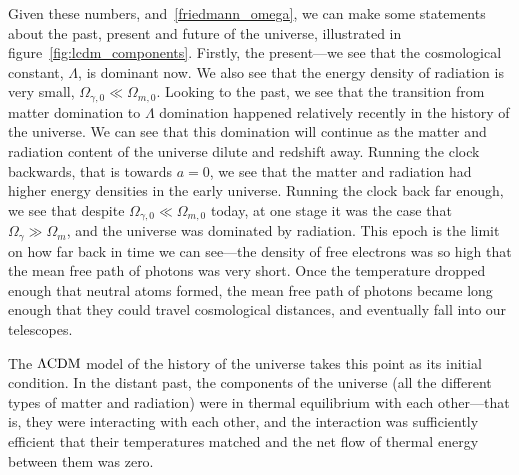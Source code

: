     Given these numbers, and~\eqref{friedmann_omega}, we can make some statements
    about the past, present and future of the universe, illustrated in figure~\ref{fig:lcdm_components}.
    Firstly, the present---we see that the cosmological constant,
    $\Lambda$, is dominant now. We also see that the energy density of radiation
    is very small, $\Omega_{\gamma,0}\ll\Omega_{m,0}$.
    Looking to the past, we see that the transition from matter domination
    to $\Lambda$ domination happened relatively recently in the history of the universe.
    We can see that this domination will continue as the matter and radiation content of the
    universe dilute and redshift away.
    Running the clock backwards, that is towards $a=0$, we see that the matter and radiation had
    higher energy densities in the early universe. Running the clock back far enough, we see
    that despite $\Omega_{\gamma,0}\ll\Omega_{m,0}$ today, at one stage it was the
    case that $\Omega_{\gamma}\gg\Omega_{m}$, and the universe was dominated by radiation.
    This epoch is the limit on how far back in time we can see---the density of free electrons
    was so high that the mean free path of photons was very short. Once the temperature
    dropped enough that neutral atoms formed, the mean free path of photons became long
    enough that they could travel cosmological distances, and eventually fall into our telescopes.


    The $\Lambda\text{CDM}$ model of the history of the universe takes this point as its initial condition.
    In the distant past, the components of the universe (all the different types of matter and radiation)
    were in thermal equilibrium with each other---that is, they were interacting with each other,
    and the interaction was sufficiently efficient that their temperatures matched
    and the net flow of thermal energy between them was zero.


